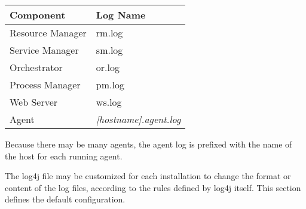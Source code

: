     \begin{tabular} {| l | l |}
       \hline
          Component & Log Name \\
      \hline
      \hline
          Resource Manager & rm.log \\
      \hline
          Service Manager & sm.log \\
      \hline
          Orchestrator & or.log \\
      \hline
          Process Manager & pm.log \\
      \hline
          Web Server & ws.log \\
      \hline
          Agent & {\em [hostname].agent.log } \\
      \hline
    \end{tabular}
    
    Because there may be many agents, the agent log is prefixed with the name of the host for
    each running agent.

    The log4j file may be customized for each installation to change the format or content of the
    log files, according to the rules defined by log4j itself.  This section defines the 
    default configuration.

